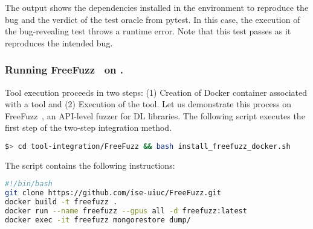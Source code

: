 \documentclass[sigconf,screen]{acmart}
\begin{document}
The output shows the dependencies installed in the environment to
reproduce the bug and the verdict of the test oracle from pytest. In
this case, the execution of the bug-revealing test throws a runtime
error. Note that this test passes as it reproduces the intended bug.



\subsubsection{Running FreeFuzz~\cite{wei2022free} on \tname.}

Tool execution proceeds in two steps: (1) Creation of Docker container
associated with a tool and (2) Execution of the tool.  Let us
demonstrate this process on FreeFuzz~\cite{wei2022free}, an API-level
fuzzer for DL libraries. The following script executes the first step
of the two-step integration method.




\begin{lstlisting}[language=bash,keywords={}]
$> cd tool-integration/FreeFuzz && bash install_freefuzz_docker.sh
\end{lstlisting}

\noindent
The script  contains the
following instructions:

\begin{lstlisting}[language=bash,keywords={}]
#!/bin/bash
git clone https://github.com/ise-uiuc/FreeFuzz.git
docker build -t freefuzz .
docker run --name freefuzz --gpus all -d freefuzz:latest
docker exec -it freefuzz mongorestore dump/
\end{lstlisting}

\end{document}
